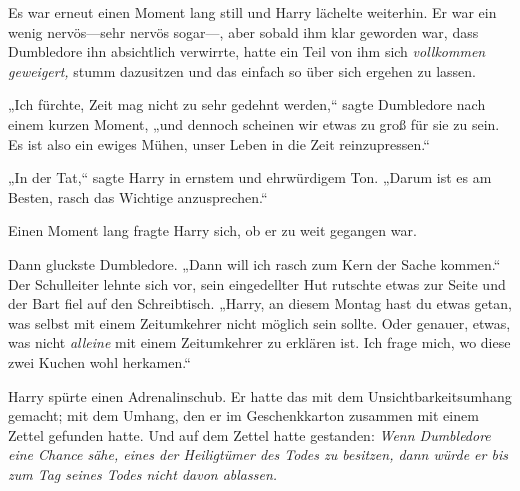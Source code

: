 Es war erneut einen Moment lang still und Harry lächelte weiterhin. Er war ein wenig nervös—sehr nervös sogar—, aber sobald ihm klar geworden war, dass Dumbledore ihn absichtlich verwirrte, hatte ein Teil von ihm sich \emph{vollkommen geweigert,} stumm dazusitzen und das einfach so über sich ergehen zu lassen.

„Ich fürchte, Zeit mag nicht zu sehr gedehnt werden,“ sagte Dumbledore nach einem kurzen Moment, „und dennoch scheinen wir etwas zu groß für sie zu sein. Es ist also ein ewiges Mühen, unser Leben in die Zeit reinzupressen.“

„In der Tat,“ sagte Harry in ernstem und ehrwürdigem Ton. „Darum ist es am Besten, rasch das Wichtige anzusprechen.“

Einen Moment lang fragte Harry sich, ob er zu weit gegangen war.

Dann gluckste Dumbledore. „Dann will ich rasch zum Kern der Sache kommen.“ Der Schulleiter lehnte sich vor, sein eingedellter Hut rutschte etwas zur Seite und der Bart fiel auf den Schreibtisch. „Harry, an diesem Montag hast du etwas getan, was selbst mit einem Zeitumkehrer nicht möglich sein sollte. Oder genauer, etwas, was nicht \emph{alleine} mit einem Zeitumkehrer zu erklären ist. Ich frage mich, wo diese zwei Kuchen wohl herkamen.“

Harry spürte einen Adrenalinschub. Er hatte das mit dem Unsichtbarkeitsumhang gemacht; mit dem Umhang, den er im Geschenkkarton zusammen mit einem Zettel gefunden hatte. Und auf dem Zettel hatte gestanden: \emph{Wenn Dumbledore eine Chance sähe, eines der Heiligtümer des Todes zu besitzen, dann würde er bis zum Tag seines Todes nicht davon ablassen.}

